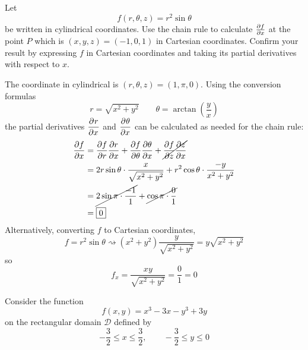 \documentclass[12pt,answers]{exam}
\begin{document}
\begin{questions}
	\newpage
	\question[15]
	Let
	\[
		f(r,\theta,z) = r^2 \sin\theta
	\]
	be written in cylindrical coordinates. Use the chain rule to calculate $\pdv{f}{x}$ at the point $P$ which is $(x,y,z) = (-1,0,1)$ in Cartesian coordinates. Confirm your result by expressing $f$ in Cartesian coordinates and taking its partial derivatives with respect to $x$.
	\begin{solution}
		The coordinate in cylindrical is $(r, \theta, z) = (1, \pi, 0)$.
		Using the conversion formulas
		\[
			r = \sqrt{x^2+y^2} \qquad \theta = \arctan(\frac yx)
		\]
		the partial derivatives $\dpd{r}{x}$ and $\dpd{\theta}{x}$ can be calculated as needed for the chain rule:
		\begin{align*}
			\pdv{f}{x} &= \pdv{f}{r} \pdv{r}{x} + \pdv{f}{\theta} \pdv{\theta}{x} + \cancel{\pdv{f}{z} \pdv{z}{x}} \\
			&= 2r \sin \theta \cdot \frac{x}{\sqrt{x^2+y^2}} + r^2 \cos\theta \cdot \frac{-y}{x^2+y^2} \\
			&= \cancel{2\sin \pi \cdot \frac{-1}{1}} + \cancel{\cos \pi \cdot \frac{0}{1}} \\
			&= \boxed{0}
		\end{align*}
		Alternatively, converting $f$ to Cartesian coordinates,
		\[
			f = r^2 \sin\theta \rightsquigarrow (x^2+y^2) \frac{y}{\sqrt{x^2+y^2}} = y \sqrt{x^2+y^2}
		\]
		so
		\[
			f_x = \frac{xy}{\sqrt{x^2+y^2}} = \frac{0}{1} = \boxed{0}
		\]
	\end{solution}

	\newpage
	\question
	Consider the function
	\[
		f(x,y) = x^3 - 3x - y^3 + 3y
	\]
	on the rectangular domain $\mathcal D$ defined by
	\[
		-\frac32 \le x \le \frac32, \qquad -\frac32 \le y \le 0
	\]
\end{questions}
\end{document}
